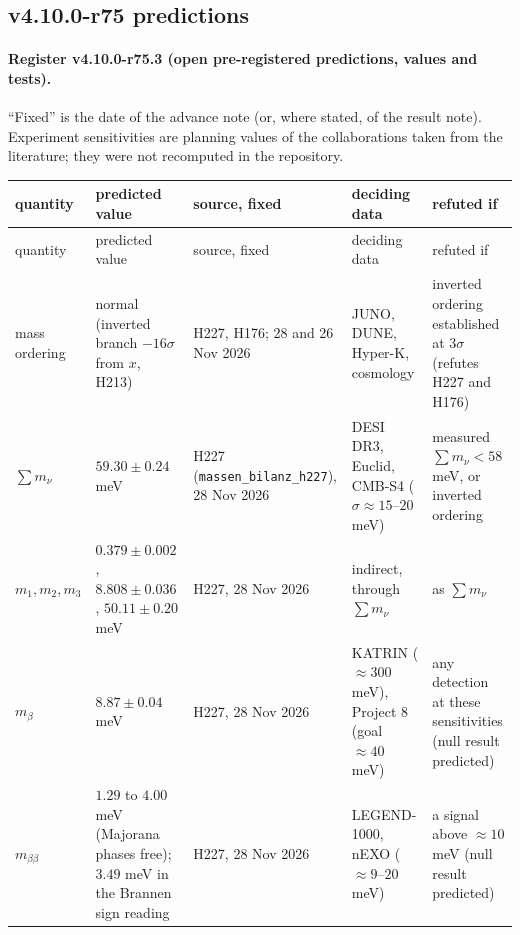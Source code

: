 \subsection*{v4.10.0-r75 predictions}
\label{subsec:v4100-r75-predictions}

\paragraph{Register v4.10.0-r75.3 (open pre-registered predictions, values and tests).}
``Fixed'' is the date of the advance note (or, where stated, of the result note).  Experiment sensitivities are planning values of the
collaborations taken from the literature; they were not recomputed in the repository.

{\small
\begin{longtable}{@{}>{\raggedright\arraybackslash}p{}>{\raggedright\arraybackslash}p{}>{\raggedright\arraybackslash}p{}>{\raggedright\arraybackslash}p{}>{\raggedright\arraybackslash}p{}@{}}
\toprule
quantity & predicted value & source, fixed & deciding data & refuted if\\
\midrule
\endfirsthead
\toprule
quantity & predicted value & source, fixed & deciding data & refuted if\\
\midrule
\endhead
\bottomrule
\endfoot
mass ordering & normal (inverted branch \(-16\sigma\) from \(x\), H213) & H227, H176; 28 and 26 Nov 2026 & JUNO, DUNE, Hyper-K, cosmology & inverted ordering established at \(3\sigma\) (refutes H227 and H176)\\
\(\sum m_\nu\) & \(59.30\pm0.24\) meV & H227 (\texttt{massen\_\allowbreak bilanz\_\allowbreak h227}), 28 Nov 2026 & DESI DR3, Euclid, CMB-S4 (\(\sigma\approx15\)--\(20\) meV) & measured \(\sum m_\nu<58\) meV, or inverted ordering\\
\(m_1,m_2,m_3\) & \(0.379\pm0.002\), \(8.808\pm0.036\), \(50.11\pm0.20\) meV & H227, 28 Nov 2026 & indirect, through \(\sum m_\nu\) & as \(\sum m_\nu\)\\
\(m_\beta\) & \(8.87\pm0.04\) meV & H227, 28 Nov 2026 & KATRIN (\(\approx300\) meV), Project 8 (goal \(\approx40\) meV) & any detection at these sensitivities (null result predicted)\\
\(m_{\beta\beta}\) & \(1.29\) to \(4.00\) meV (Majorana phases free); \(3.49\) meV in the Brannen sign reading & H227, 28 Nov 2026 & LEGEND-1000, nEXO (\(\approx9\)--\(20\) meV) & a signal above \(\approx10\) meV (null result predicted)\\

\end{longtable}}
